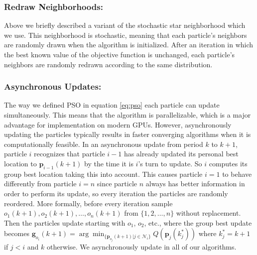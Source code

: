 \documentclass[cmbright]{staauth}
\begin{document}
\subsubsection{Redraw Neighborhoods:}
Above we briefly described a variant of the stochastic star neighborhood which we use. This neighborhood is stochastic, meaning that each particle's neighbors are randomly drawn when the algorithm is initialized. After an iteration in which the best known value of the objective function is unchanged, each particle's neighbors are randomly redrawn according to the same distribution.

\subsubsection{Asynchronous Updates:}
The way we defined PSO in equation \eqref{eq:pso} each particle can update simultaneously. This means that the algorithm is parallelizable, which is a major advantage for implementation on modern GPUs. However, asynchronously updating the particles typically results in faster converging algorithms when it is computationally feasible. In an asynchronous update from period $k$ to $k+1$, particle $i$ recognizes that particle $i-1$ has already updated its personal best location to $\bm{p}_{i-1}(k+1)$ by the time it is $i$'s turn to update. So $i$ computes its group best location taking this into account. This causes particle $i=1$ to behave differently from particle $i=n$ since particle $n$ always has better information in order to perform its update, so every iteration the particles are randomly reordered. More formally, before every iteration sample $o_1(k+1), o_2(k+1), \dots, o_{n}(k+1)$ from $\{1,2,\dots,n\}$ without replacement. Then the particles update starting with $o_1$, $o_2$, etc., where the group best update becomes $\bm{g}_{o_i}(k+1) = \arg\min_{\{\bm{p}_{o_j}(k+1)|j\in\mathcal{N}_i\}}Q(\bm{p}_j(k_j^*))$ where $k^*_j=k+1$ if $j<i$ and $k$ otherwise. We asynchronously update in all of our algorithms.
\end{document}
